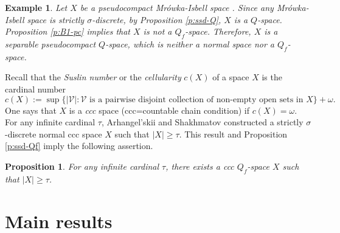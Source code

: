 \documentclass[preprint,11pt]{elsarticle}
\newtheorem{proposition}[theorem]{Proposition}
\newtheorem{example}[theorem]{Example}
\numberwithin{equation}{section}
\numberwithin{theorem}{section}
\newcommand{\w}{\omega}
\begin{document}
\begin{example}\label{exa:pcs-Qf}{\em
Let $X$ be a pseudocompact Mr\'owka-Isbell space \cite{HH2018}. Since any Mr\'owka-Isbell space is strictly $\sigma$-discrete, by Proposition \ref{p:ssd-Q}, $X$ is a $Q$-space.
Proposition \ref{p:B1-pc} implies that $X$ is not a $Q_f$-space.
Therefore, $X$ is a separable pseudocompact $Q$-space, which is neither a normal space nor a $Q_f$-space.
}\end{example}


Recall that the {\em Suslin number} or the {\em cellularity} $c(X)$ of a space $X$ is the cardinal number
\[
c(X):=\sup\big\{ |\mathcal{V}| : \mathcal{V} \text{ is a pairwise disjoint collection of non-empty open sets in }X\big\}+\w.
\]
One says that $X$ is a {\em ccc} space (ccc=countable chain condition) if $c(X) = \w$.
For any infinite cardinal $\tau$, Arhangel’skii and Shakhmatov \cite[8.6]{ArhSha1988} constructed a strictly $\sigma$-discrete normal ccc space $X$ such that $|X|\geq \tau$. This result and Proposition \ref{p:ssd-Qf} imply the following assertion.

\begin{proposition}\label{p:Gf-ccc}
For any infinite cardinal $\tau$, there exists a ccc $Q_f$-space $X$ such that $|X|\geq\tau$.
\end{proposition}



\section{Main results} \label{sec:main}

\end{document}
